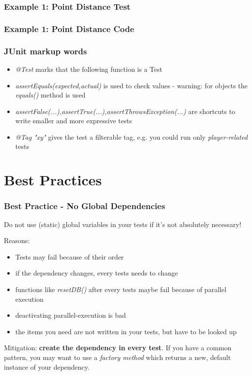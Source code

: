 \documentclass[12pt]{beamer}
\begin{document}
	\begin{frame}[fragile]
		\frametitle{Example 1: Point Distance Test}
		\begin{scriptsize}
				
		\end{scriptsize}
	\end{frame}
	
	\begin{frame}[fragile]
		\frametitle{Example 1: Point Distance Code}
		\begin{small}
				
		\end{small}
	\end{frame}
	
	\begin{frame}
		\frametitle{JUnit markup words}
		\begin{itemize}
			\item \textit{@Test} marks that the following function is a Test
			\item \textit{assertEquals(expected,actual)} is used to check values - warning: for objects the \textit{equals()} method is used 
			\item \textit{assertFalse(...),assertTrue(...),assertThrowsException(...)} are shortcuts to write smaller and more expressive tests
			\item \textit{@Tag "xy"} gives the test a filterable tag, e.g. you could run only \textit{player-related} tests
		\end{itemize}
	\end{frame}

	\section{Best Practices}

	\begin{frame}
		\frametitle{Best Practice - No Global Dependencies}
		Do not use (static) global variables in your tests if it's not absolutely necessary! 
		
		Reasons: 
		\begin{itemize}
			\item Tests may fail because of their order
			\item if the dependency changes, every tests needs to change
			\item functions like \textit{resetDB()} after every tests maybe fail because of parallel execution
			\item deactivating parallel-execution is bad
			\item the items you need are not written in your tests, but have to be looked up
		\end{itemize}
	
		Mitigation: \textbf{create the dependency in every test}. If you have a common pattern, you may want to use a \textit{factory method} which returns a new, default instance of your  dependency.
	\end{frame}
	
\end{document}
